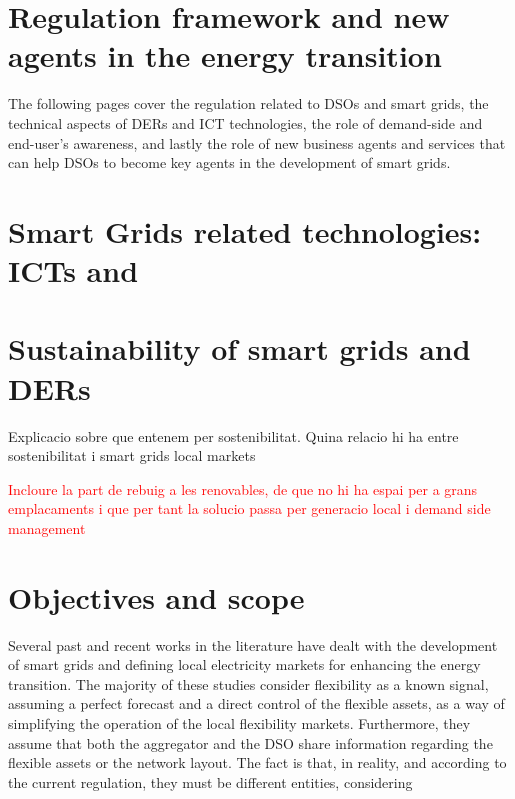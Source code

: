 %
%
%


\section{Regulation framework and new agents in the energy transition}

The following pages cover the regulation related to DSOs and smart grids, the technical aspects of DERs and ICT technologies, the role of demand-side and end-user's awareness, and lastly the role of new business agents and services that can help DSOs to become key agents in the development of smart grids. 



\section{Smart Grids related technologies: ICTs and }

\section{Sustainability of smart grids and DERs}
Explicacio sobre que entenem per sostenibilitat. Quina relacio hi ha entre sostenibilitat i smart grids local markets 

\textcolor{red}{Incloure la part de rebuig a les renovables, de que no hi ha espai per a grans emplacaments i que per tant la solucio passa per generacio local i demand side management}


\newpage 
\section{Objectives and scope}
Several past and recent works in the literature have dealt with the development of smart grids and defining local electricity markets for enhancing the energy transition. The majority of these studies consider flexibility as a known signal, assuming a perfect forecast and a direct control of the flexible assets, as a way of simplifying the operation of the local flexibility markets. Furthermore, they assume that both the aggregator and the DSO share information regarding the flexible assets or the network layout. The fact is that, in reality, and according to the current regulation, they must be different entities, considering 

